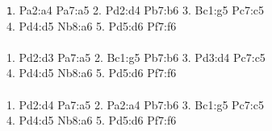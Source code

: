 \documentclass[times, 10pt,twocolumn]{article}
\newenvironment{mytinylisting}
{\begin{list}{}{\setlength{\leftmargin}{1em}}\item\scriptsize\texttt}
{\end{list}}
\begin{document}
\begin{figure}
\begin{mytinylisting}
1. Pa2:a4 Pa7:a5 2. Pd2:d4 Pb7:b6 3. Bc1:g5 Pc7:c5 \\
4. Pd4:d5 Nb8:a6 5. Pd5:d6 Pf7:f6 \\
\\
1. Pd2:d3 Pa7:a5 2. Bc1:g5 Pb7:b6 3. Pd3:d4 Pc7:c5 \\
4. Pd4:d5 Nb8:a6 5. Pd5:d6 Pf7:f6 \\
\\
1. Pd2:d4 Pa7:a5 2. Pa2:a4 Pb7:b6 3. Bc1:g5 Pc7:c5 \\
4. Pd4:d5 Nb8:a6 5. Pd5:d6 Pf7:f6 \\


\end{mytinylisting}
\end{figure}
\end{document}
